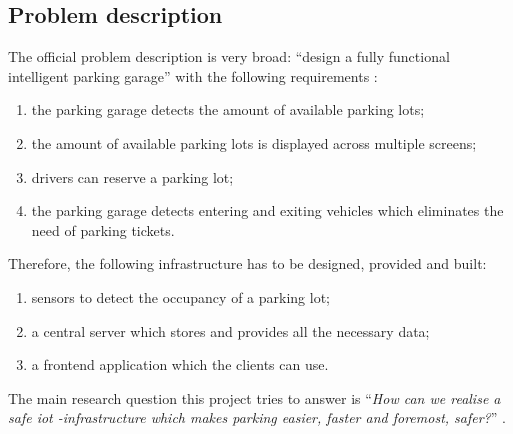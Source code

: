 
\subsection{Problem description}\label{sec:Problem description}
The official problem description is very broad: ``design a fully functional intelligent parking garage'' with the following requirements \cite{project_description}:
\begin{enumerate}
    \item the parking garage detects the amount of available parking lots;
    \item the amount of available parking lots is displayed across multiple screens;
    \item drivers can reserve a parking lot;
    \item the parking garage detects entering and exiting vehicles which eliminates the need of parking tickets.
\end{enumerate}
Therefore, the following infrastructure has to be designed, provided and built:
\begin{enumerate}
    \item sensors to detect the occupancy of a parking lot;
    \item a central server which stores and provides all the necessary data;
    \item a frontend application which the clients can use.
\end{enumerate}
The main research question this project tries to answer is ``\textit{How can we realise a safe \ac{iot} -infrastructure which makes parking easier, faster and foremost, safer?}'' \cite{project_description}.

